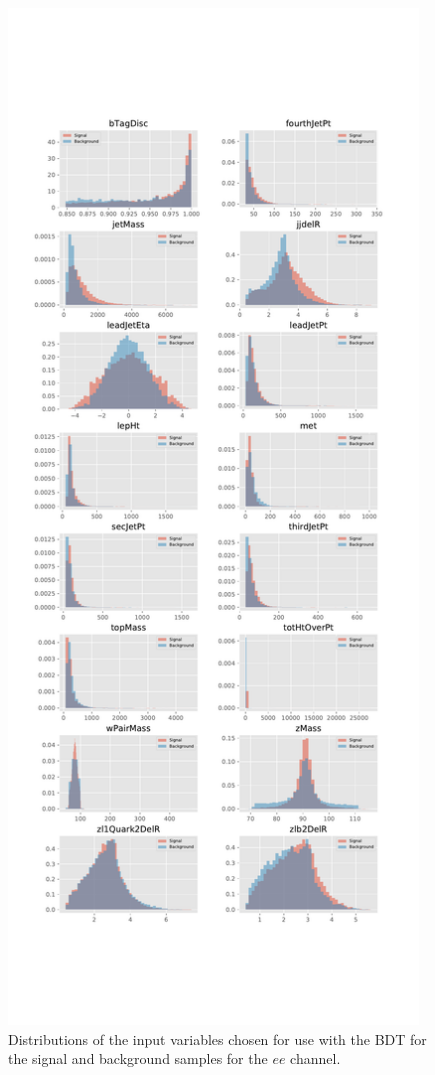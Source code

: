 \begin{figure}[htbp]
\centering
\includegraphics[width=0.97\textwidth]{figs/background-estimation/plots/vars_ee.pdf}
\caption{
Distributions of the input variables chosen for use with the BDT for the signal and background samples for the $ee$ channel.}
\label{fig:inputFeaturesDistributions_ee}
\end{figure}

